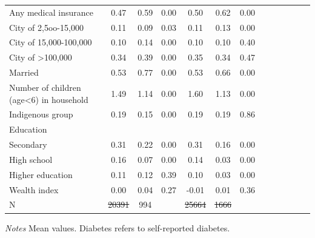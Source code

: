 \documentclass[12pt,english]{article}
\providecommand{\DIFaddtex}[1]{{\protect\color{blue}\uwave{#1}}} %
\providecommand{\DIFdeltex}[1]{{\protect\color{red}\sout{#1}}}                      %
\providecommand{\DIFaddFL}[1]{\DIFadd{#1}} %
\providecommand{\DIFdelFL}[1]{\DIFdel{#1}} %
\providecommand{\DIFaddbeginFL}{} %
\providecommand{\DIFaddendFL}{} %
\providecommand{\DIFdelbeginFL}{} %
\providecommand{\DIFdelendFL}{} %
\providecommand{\DIFadd}[1]{\texorpdfstring{\DIFaddtex{#1}}{#1}} %
\providecommand{\DIFdel}[1]{\texorpdfstring{\DIFdeltex{#1}}{}} %
\begin{document}
\begin{table}[!ht]
\begin{adjustbox}{max width=\linewidth, center}
\begin{threeparttable}
{\begin{tabular}{l*{6}{S S}}
					Any medical insurance&        0.47&        0.59&        0.00&        0.50&        0.62&        0.00\\
					City of 2,5oo-15,000&        0.11&        0.09&        0.03&        0.11&        0.13&        0.00\\
					City of 15,000-100,000&        0.10&        0.14&        0.00&        0.10&        0.10&        0.40\\
					City of >100,000    &        0.34&        0.39&        0.00&        0.35&        0.34&        0.47\\
					Married             &        0.53&        0.77&        0.00&        0.53&        0.66&        0.00\\
					Number of children (age<6) in household&        1.49&        1.14&        0.00&        1.60&        1.13&        0.00\\
					Indigenous group    &        0.19&        0.15&        0.00&        0.19&        0.19&        0.86\\
					Education &&&&&& \\                    
					\hspace*{10mm}Secondary           &        0.31&        0.22&        0.00&        0.31&        0.16&        0.00\\
					\hspace*{10mm}High school         & 0.16&        0.07&        0.00&        0.14&        0.03&        0.00\\
					\hspace*{10mm}Higher education    & 0.11&        0.12&        0.39&        0.10&        0.03&        0.00\\
					Wealth index        &        0.00&        0.04&        0.27&       -0.01&        0.01&        0.36\\
					N &\DIFdelbeginFL \DIFdelFL{20391}\DIFdelendFL \DIFaddbeginFL \DIFaddFL{20394}\DIFaddendFL &994&&\DIFdelbeginFL \DIFdelFL{25664}\DIFdelendFL \DIFaddbeginFL \DIFaddFL{25672}\DIFaddendFL &\DIFdelbeginFL \DIFdelFL{1666}\DIFdelendFL \DIFaddbeginFL \DIFaddFL{1667}\DIFaddendFL &\\
					\bottomrule
				\end{tabular}
				\begin{tablenotes}
					\item \footnotesize \textit{Notes} Mean values. Diabetes refers to self-reported diabetes.
				\end{tablenotes}
			}
		\end{threeparttable}
	\end{adjustbox}
\end{table}
\clearpage
\end{document}
